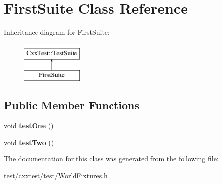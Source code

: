 \hypertarget{classFirstSuite}{\section{First\-Suite Class Reference}
\label{classFirstSuite}
}
Inheritance diagram for First\-Suite\-:\begin{figure}[H]
\begin{center}
\leavevmode
\includegraphics[height=2.000000cm]{classFirstSuite}
\end{center}
\end{figure}
\subsection*{Public Member Functions}
\begin{DoxyCompactItemize}
\item 
\hypertarget{classFirstSuite_a445fdb20f8d37d26f49cee8cc2671c67}{void {\bfseries test\-One} ()}\label{classFirstSuite_a445fdb20f8d37d26f49cee8cc2671c67}

\item 
\hypertarget{classFirstSuite_a734ffa5d1859dbf95ffbca912f88e15f}{void {\bfseries test\-Two} ()}\label{classFirstSuite_a734ffa5d1859dbf95ffbca912f88e15f}

\end{DoxyCompactItemize}


The documentation for this class was generated from the following file\-:\begin{DoxyCompactItemize}
\item 
test/cxxtest/test/World\-Fixtures.\-h\end{DoxyCompactItemize}
